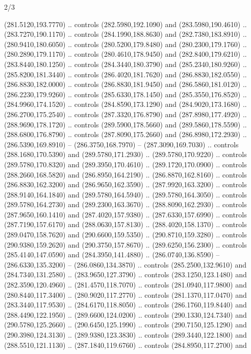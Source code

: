 \begin{flagdescription}{2/3}
\begin{scope}[xshift=0.5\flaglength,yshift=0.5\flagwidth,scale=\stretchfactor]
\begin{scope}[scale=0.001645\flagwidth,yshift=65mm,xshift=-63mm]
\begin{scope}[y=0.80pt, x=0.80pt, yscale=-1,]
\begin{scope}[cm={{1.33333,0.0,0.0,1.33333,(0.0,1e-05)}}]
  (281.5120,193.7770) .. controls (282.5980,192.1090) and (283.5980,190.4610) ..
  (283.7270,190.1170) .. controls (284.1990,188.8630) and (282.7380,183.8910) ..
  (280.9410,180.6050) .. controls (280.5200,179.8480) and (280.2300,179.1760) ..
  (280.2890,179.1170) .. controls (280.4610,178.9450) and (282.8400,179.6210) ..
  (283.8440,180.1250) .. controls (284.3440,180.3790) and (285.2340,180.9260) ..
  (285.8200,181.3440) .. controls (286.4020,181.7620) and (286.8830,182.0550) ..
  (286.8830,182.0000) .. controls (286.8830,181.9450) and (286.5860,181.0120) ..
  (286.2230,179.9260) .. controls (285.6330,178.1450) and (285.3550,176.8520) ..
  (284.9960,174.1520) .. controls (284.8590,173.1290) and (284.9020,173.1680) ..
  (286.2700,175.2540) .. controls (287.3320,176.8790) and (287.8980,177.4920) ..
  (288.9690,178.1720) .. controls (289.5900,178.5660) and (289.5860,178.5590) ..
  (288.6800,176.8790) .. controls (287.8090,175.2660) and (286.8980,172.2930) ..
  (286.5390,169.8910) -- (286.3750,168.7970) -- (287.3090,169.7030) .. controls
  (288.1680,170.5390) and (289.5780,171.2930) .. (289.5780,170.9220) .. controls
  (289.5780,170.8320) and (289.3950,170.4610) .. (289.1720,170.0900) .. controls
  (288.2660,168.5820) and (286.8950,164.2190) .. (286.8870,162.8160) .. controls
  (286.8830,162.3200) and (286.9650,162.3590) .. (287.9920,163.3200) .. controls
  (288.9140,164.1840) and (289.5780,164.5940) .. (289.5780,164.3050) .. controls
  (289.5780,164.2730) and (289.2300,163.3670) .. (288.8090,162.2930) .. controls
  (287.9650,160.1410) and (287.4020,157.9380) .. (287.6330,157.6990) .. controls
  (287.7190,157.6170) and (288.0630,157.8130) .. (288.4020,158.1370) .. controls
  (289.0470,158.7620) and (290.6600,159.5350) .. (290.8710,159.3280) .. controls
  (290.9380,159.2620) and (290.3750,157.8670) .. (289.6250,156.2300) .. controls
  (285.4140,147.0590) and (284.3950,141.4880) .. (286.0740,136.8590) --
  (286.6330,135.3200) -- (286.0860,134.3870) .. controls (285.2500,132.9610) and
  (284.7340,131.2580) .. (283.9650,127.3790) .. controls (283.1250,123.1480) and
  (282.3590,120.4960) .. (281.4570,118.7070) .. controls (281.0940,117.9800) and
  (280.8440,117.3400) .. (280.9020,117.2770) .. controls (281.1370,117.0470) and
  (283.3440,117.9530) .. (284.6170,118.8050) .. controls (286.1760,119.8440) and
  (288.4490,122.1950) .. (289.6600,124.0200) .. controls (290.1330,124.7340) and
  (290.5780,125.2660) .. (290.6450,125.1990) .. controls (290.7150,125.1290) and
  (290.3980,124.3130) .. (289.9380,123.3830) .. controls (289.3440,122.1800) and
  (288.5510,121.1130) .. (287.1840,119.6760) .. controls (284.8950,117.2700) and

\end{scope}
\end{scope}
\end{scope}
\end{scope}
\end{flagdescription}
